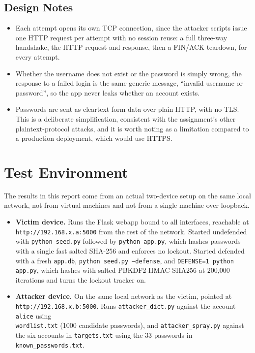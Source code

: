 \documentclass[11pt]{article}
\begin{document}
\subsection{Design Notes}

\begin{itemize}[leftmargin=*]
  \item Each attempt opens its own TCP connection, since the attacker
    scripts issue one HTTP request per attempt with no session reuse: a
    full three-way handshake, the HTTP request and response, then a
    FIN/ACK teardown, for every attempt.
  \item Whether the username does not exist or the password is simply
    wrong, the response to a failed login is the same generic message,
    ``invalid username or password'', so the app never leaks whether an
    account exists.
  \item Passwords are sent as cleartext form data over plain HTTP, with no
    TLS. This is a deliberate simplification, consistent with the
    assignment's other plaintext-protocol attacks, and it is worth noting
    as a limitation compared to a production deployment, which would use
    HTTPS.
\end{itemize}

\section{Test Environment}
\label{sec:environment}

The results in this report come from an actual two-device setup on the same
local network, not from virtual machines and not from a single machine over
loopback.

\begin{itemize}[leftmargin=*]
  \item \textbf{Victim device.} Runs the Flask webapp bound to all
    interfaces, reachable at \\
    \texttt{http://192.168.x.a:5000} from the
    rest of the network. Started undefended with \texttt{python seed.py} followed by \texttt{python app.py}, which hashes passwords with a single fast salted SHA-256 and enforces no lockout. Started defended with a fresh \texttt{app.db}, \texttt{python seed.py --defense}, and \texttt{DEFENSE=1 python app.py}, which hashes with salted PBKDF2-HMAC-SHA256 at 200{,}000 iterations and turns the lockout tracker on.
  \item \textbf{Attacker device.} On the same local network as the victim,
    pointed at \\
    \texttt{http://192.168.x.b:5000}. Runs \texttt{attacker\_dict.py} against the account \texttt{alice} using \\
    \texttt{wordlist.txt} (1000 candidate passwords), and \texttt{attacker\_spray.py} against the six accounts in \texttt{targets.txt} using the 33 passwords in \texttt{known\_passwords.txt}.
\end{itemize}
\newpage
\end{document}
